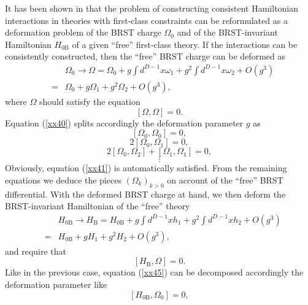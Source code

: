 \documentclass[a4paper,12pt]{article}
\begin{document}
It has been shown in \cite{12} that the problem of constructing consistent
Hamiltonian interactions in theories with first-class constraints can be
reformulated as a deformation problem of the BRST charge $\Omega _{0}$ and
of the BRST-invariant Hamiltonian $H_{0\mathrm{B}}$ of a given ``free''
first-class theory. If the interactions can be consistently constructed,
then the ``free'' BRST charge can be deformed as 
\begin{eqnarray}
&&\Omega _{0}\rightarrow \Omega =\Omega _{0}+g\int d^{D-1}x\omega
_{1}+g^{2}\int d^{D-1}x\omega _{2}+O\left( g^{3}\right)   \nonumber \\
&=&\Omega _{0}+g\Omega _{1}+g^{2}\Omega _{2}+O\left( g^{3}\right) ,
\label{xx39}
\end{eqnarray}
where $\Omega $ should satisfy the equation 
\begin{equation}
\left[ \Omega ,\Omega \right] =0.  \label{xx40}
\end{equation}
Equation (\ref{xx40}) splits accordingly the deformation parameter $g$ as 
\begin{equation}
\left[ \Omega _{0},\Omega _{0}\right] =0,  \label{xx41}
\end{equation}
\begin{equation}
2\left[ \Omega _{0},\Omega _{1}\right] =0,  \label{xx42}
\end{equation}
\begin{equation}
2\left[ \Omega _{0},\Omega _{2}\right] +\left[ \Omega _{1},\Omega
_{1}\right] =0,  \label{xx43}
\end{equation}
\[
\vdots 
\]
Obviously, equation (\ref{xx41}) is automatically satisfied. From the
remaining equations we deduce the pieces $\left( \Omega _{k}\right) _{k>0}$
on account of the ``free'' BRST differential. With the deformed BRST charge
at hand, we then deform the BRST-invariant Hamiltonian of the ``free''
theory 
\begin{eqnarray}
&&H_{0\mathrm{B}}\rightarrow H_{\mathrm{B}}=H_{0\mathrm{B}}+g\int
d^{D-1}xh_{1}+g^{2}\int d^{D-1}xh_{2}+O\left( g^{3}\right)   \nonumber \\
&=&H_{0\mathrm{B}}+gH_{1}+g^{2}H_{2}+O\left( g^{3}\right) ,  \label{xx44}
\end{eqnarray}
and require that 
\begin{equation}
\left[ H_{\mathrm{B}},\Omega \right] =0.  \label{xx45}
\end{equation}
Like in the previous case, equation (\ref{xx45}) can be decomposed
accordingly the deformation parameter like 
\begin{equation}
\left[ H_{0\mathrm{B}},\Omega _{0}\right] =0,  \label{xx46}
\end{equation}
\end{document}
